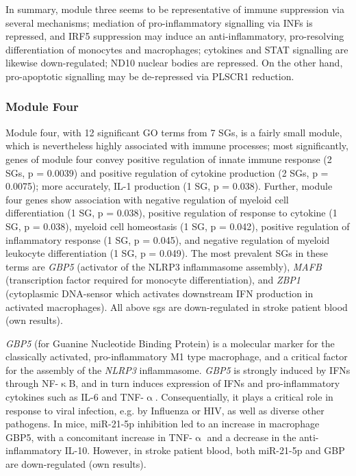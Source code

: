 In summary, module three seems to be representative of immune suppression via several mechanisms; mediation of pro-inflammatory signalling via INFs is repressed, and IRF5 suppression may induce an anti-inflammatory, pro-resolving differentiation of monocytes and macrophages; cytokines and STAT signalling are likewise down-regulated; ND10 nuclear bodies are repressed. On the other hand, pro-apoptotic signalling may be de-repressed via PLSCR1 reduction.

\subsubsection{Module Four}
Module four, with 12 significant GO terms from 7 SGs, is a fairly small module, which is nevertheless highly associated with immune processes; most significantly, genes of module four convey positive regulation of innate immune response (2 SGs, p = 0.0039) and positive regulation of cytokine production (2 SGs, p = 0.0075); more accurately, IL-1 production (1 SG, p = 0.038). Further, module four genes show association with negative regulation of myeloid cell differentiation (1 SG, p = 0.038), positive regulation of response to cytokine (1 SG, p = 0.038), myeloid cell homeostasis (1 SG, p = 0.042), positive regulation of inflammatory response (1 SG, p = 0.045), and negative regulation of myeloid leukocyte differentiation (1 SG, p = 0.049). The most prevalent SGs in these terms are \emph{GBP5} (activator of the NLRP3 inflammasome assembly), \emph{MAFB} (transcription factor required for monocyte differentiation), and \emph{ZBP1} (cytoplasmic DNA-sensor which activates downstream IFN production in activated macrophages). All above \acp{sg} are down-regulated in stroke patient blood (own results).

\emph{GBP5} (for Guanine Nucleotide Binding Protein) is a molecular marker for the classically activated, pro-inflammatory M1 type macrophage,\cite{Fujiwara2016} and a critical factor for the assembly of the \emph{NLRP3} inflammasome.\cite{Shenoy2012} \emph{GBP5} is strongly induced by IFNs through NF-$\upkappa$B, and in turn induces expression of IFNs and pro-inflammatory cytokines such as IL-6 and TNF-$\upalpha$.\cite{Feng2017} Consequentially, it plays a critical role in response to viral infection, e.g. by Influenza or HIV, as well as diverse other pathogens.\cite{Feng2017,Krapp2016} In mice, miR-21-5p inhibition led to an increase in macrophage GBP5, with a concomitant increase in TNF-$\upalpha$ and a decrease in the anti-inflammatory IL-10.\cite{Corsetti2018} However, in stroke patient blood, both miR-21-5p and GBP are down-regulated (own results).

